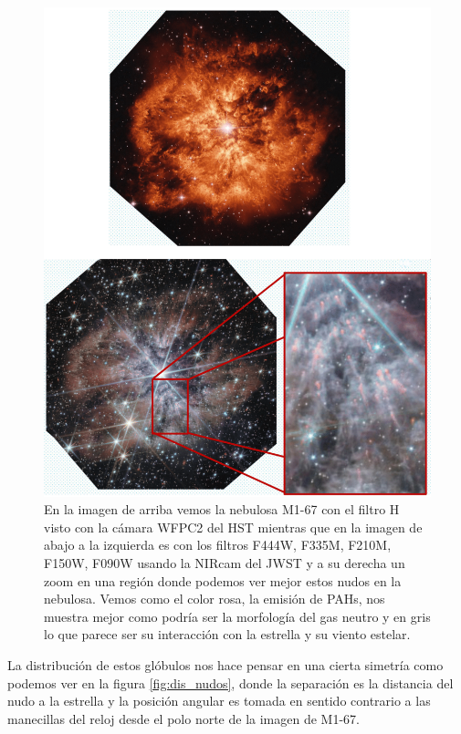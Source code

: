 \documentclass{book}
\begin{document}
\begin{figure}[htb]
    \centering
    \includegraphics[width=\textwidth]{images Chapter 1/c1WR.png}
    \caption{En la imagen de arriba vemos la nebulosa M1-67 con el filtro \unit{H\alpha} visto con la cámara WFPC2 del HST mientras que en la imagen de abajo a la izquierda es con los filtros F444W, F335M, F210M, F150W, F090W usando la NIRcam del JWST y a su derecha un zoom en una región donde podemos ver mejor estos nudos en la nebulosa. Vemos como el color rosa, la emisión de PAHs, nos muestra mejor como podría ser la morfología del gas neutro y en gris lo que parece ser su interacción con la estrella y su viento estelar.}
    \label{fig:nudos WR124}
\end{figure}

La distribución de estos glóbulos nos hace pensar en una cierta simetría como podemos ver en la figura \ref{fig:dis_nudos}, donde la separación es la distancia del nudo a la estrella y la posición angular es tomada en sentido contrario a las manecillas del reloj desde el polo norte de la imagen de M1-67.
\end{document}
